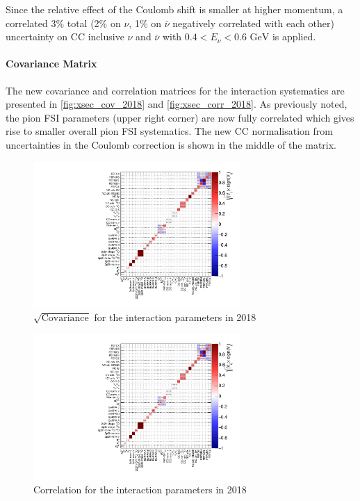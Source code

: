 Since the relative effect of the Coulomb shift is smaller at higher momentum, a correlated 3\% total (2\% on $\nu$, 1\% on $\bar{\nu}$ negatively correlated with each other) uncertainty on CC inclusive $\nu$ and $\bar{\nu}$ with $0.4 < E_\nu < 0.6 \text{ GeV}$ is applied.

\paragraph{Covariance Matrix}
The new covariance and correlation matrices for the interaction systematics are presented in \autoref{fig:xsec_cov_2018} and \autoref{fig:xsec_corr_2018}. As previously noted, the pion FSI parameters (upper right corner) are now fully correlated which gives rise to smaller overall pion FSI systematics. The new CC normalisation from uncertainties in the Coulomb correction is shown in the middle of the matrix.
\begin{figure}[h]
	\includegraphics[width=0.7\textwidth,page=1, trim={0mm 0mm 0mm 0mm}, clip]{figures/niwg/xsec_covariance_2018a_NOMINAL_v11_xseccov}
	\caption{$\sqrt{\text{Covariance}}$ for the interaction parameters in 2018}
	\label{fig:xsec_cov_2018}
\end{figure}

\begin{figure}[h]
	\includegraphics[width=0.7\textwidth,page=2, trim={0mm 0mm 0mm 0mm}, clip]{figures/niwg/xsec_covariance_2018a_NOMINAL_v11_xseccov}
	\caption{Correlation for the interaction parameters in 2018}
	\label{fig:xsec_corr_2018}
\end{figure}

